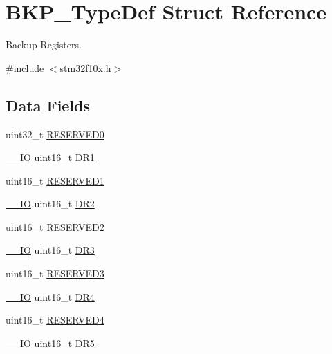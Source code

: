 \hypertarget{struct_b_k_p___type_def}{}\section{B\+K\+P\+\_\+\+Type\+Def Struct Reference}
\label{struct_b_k_p___type_def}


Backup Registers.  




{\ttfamily \#include $<$stm32f10x.\+h$>$}

\subsection*{Data Fields}
\begin{DoxyCompactItemize}
\item 
uint32\+\_\+t \mbox{\hyperlink{struct_b_k_p___type_def_af86c61a5d38a4fc9cef942a12744486b}{R\+E\+S\+E\+R\+V\+E\+D0}}
\item 
\mbox{\hyperlink{core__sc300_8h_aec43007d9998a0a0e01faede4133d6be}{\+\_\+\+\_\+\+IO}} uint16\+\_\+t \mbox{\hyperlink{struct_b_k_p___type_def_aa65308ed0a581d7e41f22beb05d61e97}{D\+R1}}
\item 
uint16\+\_\+t \mbox{\hyperlink{struct_b_k_p___type_def_a8249a3955aace28d92109b391311eb30}{R\+E\+S\+E\+R\+V\+E\+D1}}
\item 
\mbox{\hyperlink{core__sc300_8h_aec43007d9998a0a0e01faede4133d6be}{\+\_\+\+\_\+\+IO}} uint16\+\_\+t \mbox{\hyperlink{struct_b_k_p___type_def_aedc8dc6401c19fe52847927cb440fd72}{D\+R2}}
\item 
uint16\+\_\+t \mbox{\hyperlink{struct_b_k_p___type_def_a5573848497a716a9947fd87487709feb}{R\+E\+S\+E\+R\+V\+E\+D2}}
\item 
\mbox{\hyperlink{core__sc300_8h_aec43007d9998a0a0e01faede4133d6be}{\+\_\+\+\_\+\+IO}} uint16\+\_\+t \mbox{\hyperlink{struct_b_k_p___type_def_ab5177f3cf6e5b95e1ed5bbe4d02f63a4}{D\+R3}}
\item 
uint16\+\_\+t \mbox{\hyperlink{struct_b_k_p___type_def_a6c3b31022e6f59b800e9f5cc2a89d54c}{R\+E\+S\+E\+R\+V\+E\+D3}}
\item 
\mbox{\hyperlink{core__sc300_8h_aec43007d9998a0a0e01faede4133d6be}{\+\_\+\+\_\+\+IO}} uint16\+\_\+t \mbox{\hyperlink{struct_b_k_p___type_def_ac8213f98fc01d7b25f1f9206713748ee}{D\+R4}}
\item 
uint16\+\_\+t \mbox{\hyperlink{struct_b_k_p___type_def_aa0223808025f5bf9c056185038c9d545}{R\+E\+S\+E\+R\+V\+E\+D4}}
\item 
\mbox{\hyperlink{core__sc300_8h_aec43007d9998a0a0e01faede4133d6be}{\+\_\+\+\_\+\+IO}} uint16\+\_\+t \mbox{\hyperlink{struct_b_k_p___type_def_a4b63234b8f0828d5f419e62666c3e57e}{D\+R5}}

\end{DoxyCompactItemize}
